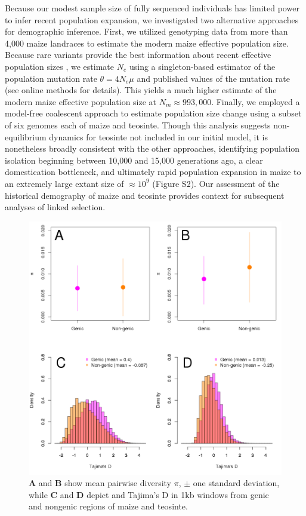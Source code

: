 \documentclass[12pt,a4paper]{article}
\begin{document}
Because our modest sample size of fully sequenced individuals has limited power to infer recent population expansion, we investigated two alternative approaches for demographic inference.  
First, we utilized genotyping data from more than 4,000 maize landraces \cite{Hearne2015} to estimate the modern maize effective population size.
Because rare variants provide the best information about recent effective population sizes \cite{keinan2012}, we estimate $N_e$ using  a singleton-based estimator \cite{fu1993} of the population mutation rate $\theta=4N_e\mu$  and published values of the mutation rate \cite{clark2005} (see online methods for details). 
This yields a much higher estimate of the modern maize effective population size at  $N_m \approx 993,000$.
Finally, we employed a model-free coalescent approach \cite{schiffels2014} to estimate population size change using a subset of six genomes each of maize and teosinte.
Though this analysis suggests non-equilibrium dynamics for teosinte not included in our initial model, it is nonetheless broadly consistent with the other approaches, identifying population isolation beginning between 10,000 and 15,000 generations ago, a clear domestication bottleneck, and ultimately rapid population expansion in maize to an extremely large extant size of $\approx 10^9$ (Figure S2).
Our assessment of the historical demography of maize and teosinte provides context for subsequent analyses of linked selection.


\begin{figure}[!tb]
  \begin{center}
  \includegraphics[width=.45\textwidth] {FigsAndFiles/Pi_and_Tajima.png}
\end{center}
\caption{\textbf{A} and \textbf{B} show mean pairwise diversity $\pi$, $\pm$ one standard deviation, while \textbf{C} and \textbf{D} depict and Tajima's D in 1kb windows from genic and nongenic regions of maize and teosinte.   \label{fig:diversity} }
\end{figure}
\end{document}
